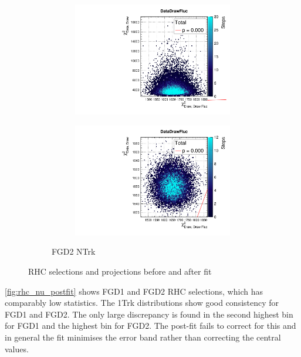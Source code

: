 \begin{figure}[h]
\begin{subfigure}[t]{\textwidth}
\begin{subfigure}[t]{0.24\textwidth}
\includegraphics[width=\textwidth, trim={0mm 0mm 0mm 8mm}, clip,page=92]{figures/mach3/data/priorpred/2017b_NewDet_3Xsec_4Det_5Flux_NewXSecTune_Data_merge_PriorPred_procs}
\end{subfigure}
\begin{subfigure}[t]{0.24\textwidth}
\includegraphics[width=\textwidth, trim={0mm 0mm 0mm 8mm}, clip,page=92]{figures/mach3/data/postpred/2017b_NewData_NewDet_UpdXsecStep_2Xsec_4Det_5Flux_0_PostPred_procs}
\end{subfigure}
\caption{FGD2 NTrk}
\end{subfigure}
\caption{RHC \numubar selections \pmu and \cosmu projections before and after fit}
\label{fig:rhc_postfit}
\end{figure}

\autoref{fig:rhc_nu_postfit} shows FGD1 and FGD2 RHC \numu selections, which has comparably low statistics. The 1Trk distributions show good consistency for FGD1 and FGD2. The only large discrepancy is found in the second highest \cosmu bin for FGD1 and the highest \cosmu bin for FGD2. The post-fit fails to correct for this and in general the fit minimises the error band rather than correcting the central values.


